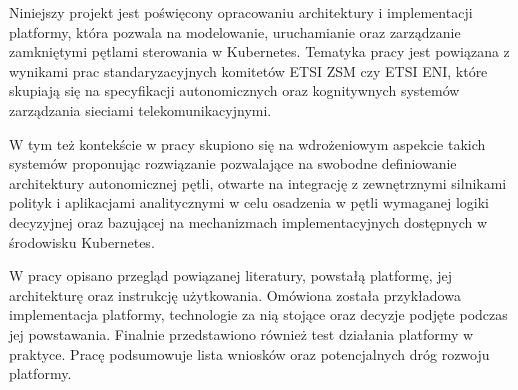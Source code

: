 Niniejszy projekt jest poświęcony opracowaniu architektury i implementacji platformy, która pozwala na modelowanie, uruchamianie oraz zarządzanie zamkniętymi pętlami sterowania w Kubernetes. Tematyka pracy jest powiązana z wynikami prac standaryzacyjnych komitetów ETSI ZSM czy ETSI ENI, które skupiają się na specyfikacji autonomicznych oraz kognitywnych systemów zarządzania sieciami telekomunikacyjnymi. 

W tym też kontekście w pracy skupiono się na wdrożeniowym aspekcie takich systemów proponując rozwiązanie pozwalające na swobodne definiowanie architektury autonomicznej pętli, otwarte na integrację z zewnętrznymi silnikami polityk i aplikacjami analitycznymi w celu osadzenia w pętli wymaganej logiki decyzyjnej oraz bazującej na mechanizmach implementacyjnych dostępnych w środowisku Kubernetes.

W pracy opisano przegląd powiązanej literatury, powstałą platformę, jej architekturę oraz instrukcję użytkowania. Omówiona została przykładowa implementacja platformy, technologie za nią stojące oraz decyzje podjęte podczas jej powstawania. Finalnie przedstawiono również test działania platformy w praktyce. Pracę podsumowuje lista wniosków oraz potencjalnych dróg rozwoju platformy. 